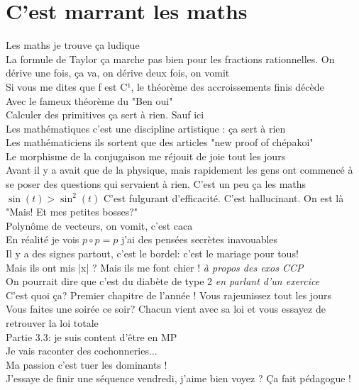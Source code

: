 \documentclass[french, a4paper, openany]{book}
\begin{document}
\section{C'est marrant les maths}

	\noindent \og Les maths je trouve ça ludique \fg \\
	\og La formule de Taylor ça marche pas bien pour les fractions rationnelles. On dérive une fois, ça va, on dérive deux fois, on vomit \fg \\
	\og Si vous me dites que f est C¹, le théorème des accroissements finis décède \fg \\
	\og Avec le fameux théorème du "Ben oui" \fg \\
	\og Calculer des primitives ça sert à rien. Sauf ici \fg \\
	\og Les mathématiques c'est une discipline artistique : ça sert à rien \fg \\
	\og Les mathématiciens ils sortent que des articles "new proof of chépakoi" \fg \\
	\og Le morphisme de la conjugaison me réjouit de joie tout les jours \fg \\
	\og Avant il y a avait que de la physique, mais rapidement les gens ont commencé à se poser des questions qui servaient à rien. C'est un peu ça les maths \fg \\
	$\sin(t) > \sin^2(t)$ \og C'est fulgurant d'efficacité. C'est hallucinant. On est là "Mais! Et mes petites bosses?" \fg \\
	\og Polynôme de vecteurs, on vomit, c'est caca \fg \\
	\og En réalité je vois $p \circ p = p$ j'ai des pensées secrètes inavouables \fg \\
	\og Il y a des signes partout, c'est le bordel: c'est le mariage pour tous! \fg \\
	\og Mais ils ont mis |x| ? Mais ils me font chier ! \fg \emph{à propos des exos CCP} \\
	\og On pourrait dire que c'est du diabète de type 2 \fg \emph{en parlant d'un exercice} \\
	\og C'est quoi ça? Premier chapitre de l'année ! Vous rajeunissez tout les jours \fg \\
	\og Vous faites une soirée ce soir? Chacun vient avec sa loi et vous essayez de retrouver la loi totale \fg \\
	\og Partie 3.3: je suis content d'être en MP \fg \\
	\og Je vais raconter des cochonneries... \fg \\
	\og Ma passion c'est tuer les dominants ! \fg \\
	\og J'essaye de finir une séquence vendredi, j'aime bien voyez ? Ça fait pédagogue ! \fg \\
\end{document}

